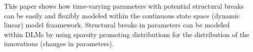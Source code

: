 \documentclass{article}
\begin{document}
This paper shows how time-varying parameters with potential structural breaks can be easily and flexibly modeled within the continuous state space (dynamic linear) model fraamework.
Structural breaks in parameters can be modeled within DLMs by using sparsity promoting distributions for the distribution of the innovations (changes in parameters).

\end{document}
